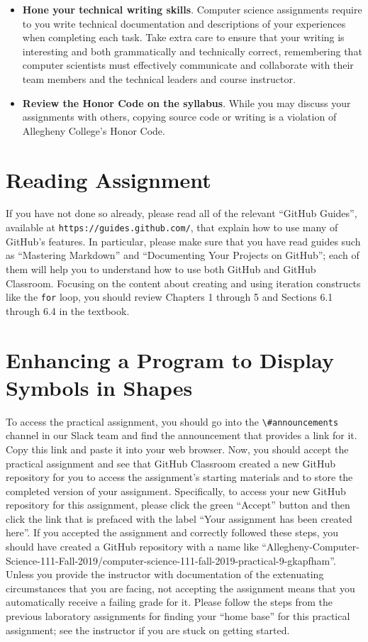 \documentclass[11pt]{article}
\newcommand{\program}[1]{\lstinline{#1}}
\newcommand{\url}[1]{\lstinline{#1}}
\newcommand{\channel}[1]{\lstinline{#1}}
\begin{document}
\begin{itemize}
\item {\bf Hone your technical writing skills}. Computer science assignments
  require to you write technical documentation and descriptions of your
  experiences when completing each task. Take extra care to ensure that your
  writing is interesting and both grammatically and technically correct,
  remembering that computer scientists must effectively communicate and
  collaborate with their team members and the technical leaders and course
  instructor.

\item {\bf Review the Honor Code on the syllabus}. While you may discuss your
  assignments with others, copying source code or writing is a violation of
  Allegheny College's Honor Code.

\end{itemize}

\section*{Reading Assignment}

If you have not done so already, please read all of the relevant ``GitHub
Guides'', available at \url{https://guides.github.com/}, that explain how to use
many of GitHub's features. In particular, please make sure that you have read
guides such as ``Mastering Markdown'' and ``Documenting Your Projects on
GitHub''; each of them will help you to understand how to use both GitHub and
GitHub Classroom. Focusing on the content about creating and using iteration
constructs like the \program{for} loop, you should review Chapters 1 through 5
and Sections 6.1 through 6.4 in the textbook.

\section*{Enhancing a Program to Display Symbols in Shapes}

To access the practical assignment, you should go into the
\channel{\#announcements} channel in our Slack team and find the announcement
that provides a link for it. Copy this link and paste it into your web browser.
Now, you should accept the practical assignment and see that GitHub Classroom
created a new GitHub repository for you to access the assignment's starting
materials and to store the completed version of your assignment. Specifically,
to access your new GitHub repository for this assignment, please click the green
``Accept'' button and then click the link that is prefaced with the label ``Your
assignment has been created here''. If you accepted the assignment and correctly
followed these steps, you should have created a GitHub repository with a name
like
``Allegheny-Computer-Science-111-Fall-2019/computer-science-111-fall-2019-practical-9-gkapfham''.
Unless you provide the instructor with documentation of the extenuating
circumstances that you are facing, not accepting the assignment means that you
automatically receive a failing grade for it. Please follow the steps from the
previous laboratory assignments for finding your ``home base'' for this
practical assignment; see the instructor if you are stuck on getting started.
\end{document}
